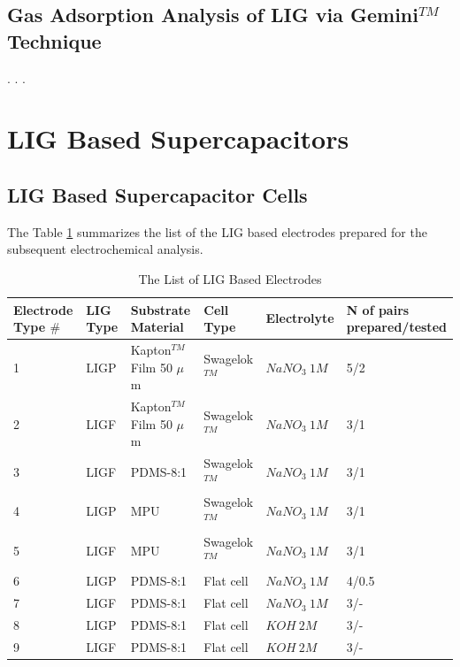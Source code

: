 \subsection{Gas Adsorption Analysis of LIG via Gemini$^{TM}$ Technique}

.
.
.

\newpage
\section{LIG Based Supercapacitors}


\subsection{LIG Based Supercapacitor Cells}



The Table \ref{tab:supercapacitor_electrodes} summarizes the list of the LIG based electrodes prepared for the subsequent electrochemical analysis.

\begin{table}[H]
\centering
    \caption{The List of LIG Based Electrodes}
    \label{tab:supercapacitor_electrodes} 
\medskip
\medskip
\begin{tabular}{ l | l | l | l | l| l  } 


	\pbox{100px}{Electrode\\Type $\#$} & LIG Type\footnotemark[1] & Substrate Material & Cell Type & Electrolyte & \pbox{100px}{N of pairs\\prepared/tested} \\ [13px]\hline
	1  & LIGP & Kapton$^{TM}$ Film 50 $\mu$m & Swagelok$^{TM}$& $NaNO_3\:1M$ & 5/2 \\ [13px]
	2  & LIGF & Kapton$^{TM}$ Film 50 $\mu$m & Swagelok$^{TM}$& $NaNO_3\:1M$ & 3/1\\ [13px]
	
	3  & LIGF & PDMS-8:1 & Swagelok$^{TM}$& $NaNO_3\:1M$ & 3/1  \\ [13px]
	
	4  & LIGP & MPU & Swagelok$^{TM}$& $NaNO_3\:1M$ & 3/1  \\ [13px]
	5  & LIGF & MPU & Swagelok$^{TM}$& $NaNO_3\:1M$ & 3/1  \\ [13px]
	
	6  & LIGP & PDMS-8:1 & Flat cell& $NaNO_3\:1M$ & 4/0.5  \\ [13px]
	7\footnotemark[2]  & LIGF & PDMS-8:1 & Flat cell& $NaNO_3\:1M$ & 3/-  \\ [13px]
	
	8\footnotemark[2]  & LIGP & PDMS-8:1 & Flat cell& $KOH\:2M$ & 3/-  \\ [13px]
	9\footnotemark[2]  & LIGF & PDMS-8:1 & Flat cell& $KOH\:2M$ & 3/-  \\ [13px]
\end{tabular}
\end{table}


